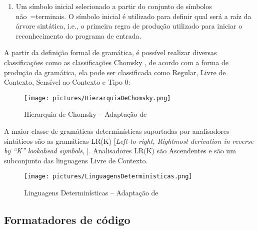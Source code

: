 {\begin{enumerate}
        \item Um símbolo inicial selecionado a partir do conjunto de símbolos não~=terminais.
        O símbolo inicial é utilizado para definir qual será a raíz da árvore sintática,
        i.e.,
        o primeira regra de produção utilizado para iniciar o reconhecimento do programa de entrada.
    \end{enumerate}

    A partir da definição formal de gramática,
    é possível realizar diversas classificações como as classificações Chomsky \cite{sipserBook},
    de acordo com a forma de produção da gramática,
    ela pode ser classificada como Regular,
    Livre de Contexto,
    Sensível ao Contexto e
    Tipo 0:
    \begin{figure}[H]
    \centering
    \texttt{[image: pictures/HierarquiaDeChomsky.png]}
    \caption{Hierarquia de Chomsky -- Adaptação de }
    \label{fig:pictures/HierarquiaDeChomsky.png}
    \end{figure}

    A maior classe de gramáticas determinísticas suportadas por
    analisadores sintáticos são as gramáticas LR(K)
    [\textit{Left-to-right,
    Rightmost derivation in reverse by ``K'' lookahead symbols},
    ].
    Analisadores LR(K) são Ascendentes e
    são um subconjunto das linguagens Livre de Contexto.
    \begin{figure}[H]
    \centering
    \texttt{[image: pictures/LinguagensDeterministicas.png]}
    \caption{Linguagens Determinísticas -- Adaptação de }
    \label{fig:pictures/LinguagensDeterministicas.png}
    \end{figure}

}

\subsection{Formatadores de código}

